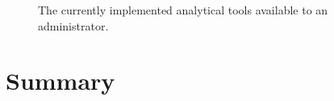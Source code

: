 \begin{figure}[h!]
	\centering
	\caption{The currently implemented analytical tools available to an administrator.}
	\label{fig:screens-analytics-list}
\end{figure}

\section{Summary}
